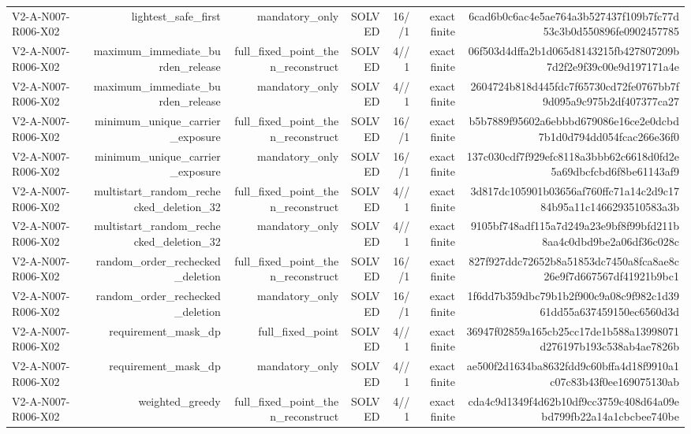 {\begin{longtable}{lrrrrrr}
V2-A-N007-R006-X02 & lightest\_safe\_first & mandatory\_only & SOLVED & 16//1 & exact finite & 6cad6b0c6ac4e5ae764a3b527437f109b7fc77d53c3b0d550896fe0902457785 \\
V2-A-N007-R006-X02 & maximum\_immediate\_burden\_release & full\_fixed\_point\_then\_reconstruct & SOLVED & 4//1 & exact finite & 06f503d4dffa2b1d065d8143215fb427807209b7d2f2e9f39c00e9d197171a4e \\
V2-A-N007-R006-X02 & maximum\_immediate\_burden\_release & mandatory\_only & SOLVED & 4//1 & exact finite & 2604724b818d445fdc7f65730cd72fe0767bb7f9d095a9c975b2df407377ca27 \\
V2-A-N007-R006-X02 & minimum\_unique\_carrier\_exposure & full\_fixed\_point\_then\_reconstruct & SOLVED & 16//1 & exact finite & b5b7889f95602a6ebbbd679086e16ce2e0dcbd7b1d0d794dd054fcac266e36f0 \\
V2-A-N007-R006-X02 & minimum\_unique\_carrier\_exposure & mandatory\_only & SOLVED & 16//1 & exact finite & 137c030cdf7f929efc8118a3bbb62c6618d0fd2e5a69dbcfcbd6f8be61143af9 \\
V2-A-N007-R006-X02 & multistart\_random\_rechecked\_deletion\_32 & full\_fixed\_point\_then\_reconstruct & SOLVED & 4//1 & exact finite & 3d817dc105901b03656af760ffc71a14c2d9c1784b95a11c1466293510583a3b \\
V2-A-N007-R006-X02 & multistart\_random\_rechecked\_deletion\_32 & mandatory\_only & SOLVED & 4//1 & exact finite & 9105bf748adf115a7d249a23e9bf8f99bfd211b8aa4c0dbd9be2a06df36c028c \\
V2-A-N007-R006-X02 & random\_order\_rechecked\_deletion & full\_fixed\_point\_then\_reconstruct & SOLVED & 16//1 & exact finite & 827f927ddc72652b8a51853dc7450a8fca8ae8c26e9f7d667567df41921b9bc1 \\
V2-A-N007-R006-X02 & random\_order\_rechecked\_deletion & mandatory\_only & SOLVED & 16//1 & exact finite & 1f6dd7b359dbc79b1b2f900c9a08c9f982c1d3961dd55a637459150ec6560d3d \\
V2-A-N007-R006-X02 & requirement\_mask\_dp & full\_fixed\_point & SOLVED & 4//1 & exact finite & 36947f02859a165cb25cc17de1b588a13998071d276197b193c538ab4ae7826b \\
V2-A-N007-R006-X02 & requirement\_mask\_dp & mandatory\_only & SOLVED & 4//1 & exact finite & ae500f2d1634ba8632fdd9c60bffa4d18f9910a1c07c83b43f0ee169075130ab \\
V2-A-N007-R006-X02 & weighted\_greedy & full\_fixed\_point\_then\_reconstruct & SOLVED & 4//1 & exact finite & cda4c9d1349f4d62b10df9cc3759c408d64a09ebd799fb22a14a1cbcbee740be \\

\end{longtable}}

